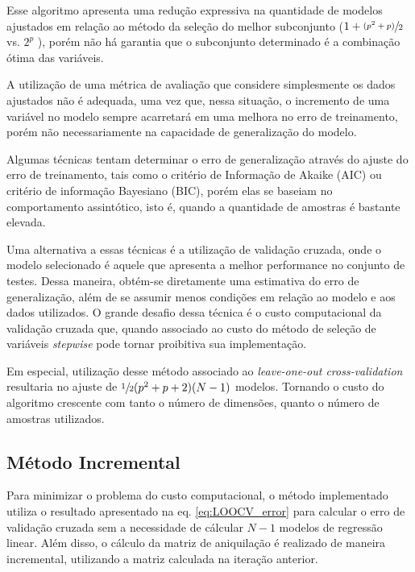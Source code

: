 Esse algoritmo apresenta uma redução expressiva na quantidade de modelos ajustados em relação ao método da 
seleção do melhor subconjunto ($1+\sfrac{(p^2+p)}{2}$ vs. $2^p$ ), porém não há
garantia que o subconjunto determinado é a combinação ótima das variáveis. \cite[p. 208]{intro_stat_learn}

A utilização de uma métrica de avaliação que considere simplesmente os dados ajustados não é adequada, 
uma vez que, nessa situação, o incremento de uma variável no modelo sempre acarretará em uma melhora no erro de 
treinamento, porém não necessariamente na capacidade de generalização do modelo.

Algumas técnicas tentam determinar o erro de generalização através do ajuste do erro de treinamento, tais como o 
critério de Informação de Akaike (AIC) ou critério de informação Bayesiano (BIC), porém elas se baseiam no 
comportamento assintótico, isto é, quando a quantidade de amostras é bastante elevada.

Uma alternativa a essas técnicas é a utilização de validação cruzada, onde o modelo selecionado é aquele que 
apresenta a melhor performance no conjunto de testes. Dessa maneira, obtém-se diretamente uma estimativa do erro 
de generalização, além de se assumir menos condições em relação ao modelo e aos dados utilizados. O grande 
desafio dessa técnica é o custo computacional da validação cruzada que, quando associado ao custo do método de 
seleção de variáveis \textit{stepwise} pode tornar proibitiva sua implementação.

Em especial, utilização desse método associado ao \textit{leave-one-out cross-validation} resultaria no ajuste 
de $\sfrac{1}{2}(p^2+p+2)(N-1)$ modelos. Tornando o custo do algoritmo crescente com tanto o número de 
dimensões, quanto o número de amostras utilizados.

\subsection{Método Incremental}

Para minimizar o problema do custo computacional, o método implementado utiliza o resultado apresentado na eq. 
\ref{eq:LOOCV_error} para calcular o erro de validação cruzada sem a necessidade de cálcular $N-1$ modelos de 
regressão linear. Além disso, o cálculo da matriz de aniquilação é realizado de maneira incremental, utilizando
a matriz calculada na iteração anterior.